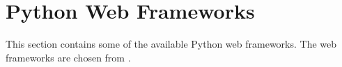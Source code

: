 \section{Python Web Frameworks}
This section contains some of the available Python web frameworks.
The web frameworks are chosen from \citet{python_web_frameworks_list}.
